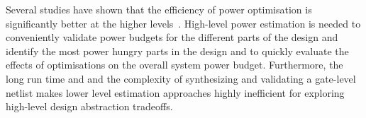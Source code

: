 
Several studies have shown that the efficiency of power optimisation is significantly better at the higher levels~\cite{Landman1996,Gupta2000,Raghunathan2003,Reimer2006}.
High-level power estimation is needed to conveniently validate power budgets for the different parts of the design and identify the most power hungry parts in the design and to quickly evaluate the effects of optimisations on the overall system power budget.
Furthermore, the long run time and and the complexity of synthesizing and validating a gate-level netlist makes lower level estimation approaches highly inefficient for exploring high-level design abstraction tradeoffs.

